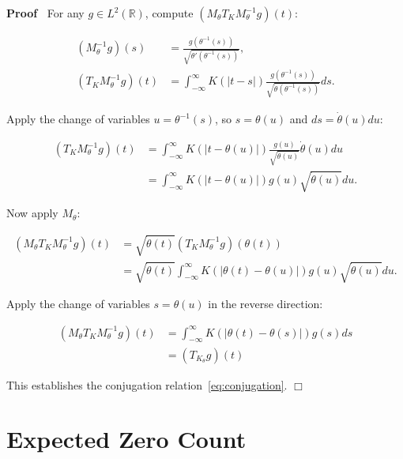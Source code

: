 \documentclass{article}
\newenvironment{proof}{\noindent\textbf{Proof\ }}{\hspace*{\fill}$\Box$\medskip}
\begin{document}
\begin{proof}
  For any $g \in L^2 (\mathbb{R})$, compute $(M_{\theta} T_K M_{\theta}^{- 1}
  g) (t)$:
  
  \begin{align}
    (M_{\theta}^{- 1} g) (s) & = \frac{g (\theta^{- 1} (s))}{\sqrt{\theta'
    (\theta^{- 1} (s))}}, \\
    (T_K M_{\theta}^{- 1} g) (t) & = \int_{- \infty}^{\infty} K (|t - s|)
    \frac{g (\theta^{- 1} (s))}{\sqrt{\dot{\theta} (\theta^{- 1} (s))}} ds. 
  \end{align}
  
  Apply the change of variables $u = \theta^{- 1} (s)$, so $s = \theta (u)$
  and $ds = \dot{\theta} (u) du$:
  
  \begin{align}
    (T_K M_{\theta}^{- 1} g) (t) & = \int_{- \infty}^{\infty} K (|t - \theta
    (u) |) \frac{g (u)}{\sqrt{\dot{\theta} (u)}}  \dot{\theta} (u) du \\
    & = \int_{- \infty}^{\infty} K (|t - \theta (u) |) g (u)
    \sqrt{\dot{\theta} (u)} du. 
  \end{align}
  
  Now apply $M_{\theta}$:
  
  \begin{align}
    (M_{\theta} T_K M_{\theta}^{- 1} g) (t) & = \sqrt{\dot{\theta} (t)}  (T_K
    M_{\theta}^{- 1} g) (\theta (t)) \\
    & = \sqrt{\dot{\theta} (t)}  \int_{- \infty}^{\infty} K (| \theta (t) -
    \theta (u) |) g (u) \sqrt{\dot{\theta} (u)} du. 
  \end{align}
  
  Apply the change of variables $s = \theta (u)$ in the reverse direction:
  
  \begin{align}
    (M_{\theta} T_K M_{\theta}^{- 1} g) (t) & = \int_{- \infty}^{\infty} K (|
    \theta (t) - \theta (s) |) g (s) ds \\
    & = (T_{K_{\theta}} g) (t) 
  \end{align}
  
  This establishes the conjugation relation~\eqref{eq:conjugation}.
\end{proof}

\section{Expected Zero Count}\label{sec:zero_count}
\end{document}
